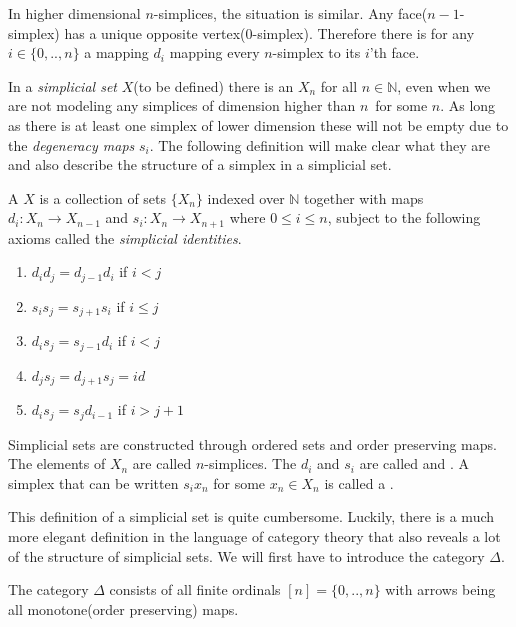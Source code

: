 \documentclass[../../main.tex]{subfiles}
\begin{document}
    In higher dimensional $n$-simplices, the situation is similar. Any face($n-1$-simplex) has a unique opposite vertex($0$-simplex). Therefore there is for any $i \in \{0,..,n\}$ a mapping $d_i$ mapping every $n$-simplex to its $i$'th face.

    In a \emph{simplicial set} $X$(to be defined) there is an $X_n$ for all $n \in \mathbb{N}$, even when we are not modeling any simplices of dimension higher than $n$ for some $n$. As long as there is at least one simplex of lower dimension these will not be empty due to the \emph{degeneracy maps} $s_i$. The following definition will make clear what they are and also describe the structure of a simplex in a simplicial set.

    \begin{definition}\label{simplicial-set}
        A  $X$ is a collection of sets $\{X_n\}$ indexed over $\mathbb{N}$ together with maps $d_i: X_n \to X_{n-1}$ and $s_i: X_n\to X_{n+1}$ where $0 \leq i \leq n$, subject to the following axioms called the \emph{simplicial identities}.
        
        \begin{enumerate}
            \item $d_id_j = d_{j-1}d_i$ if $i < j$
            \item $s_is_j = s_{j+1}s_i$ if $i \leq j$
            \item $d_is_j = s_{j-1}d_i$ if $i < j$
            \item $d_js_j = d_{j+1}s_j = id$
            \item $d_is_j = s_jd_{i-1}$ if $i > j+1$
        \end{enumerate}
    \end{definition}
    Simplicial sets are constructed through ordered sets and order preserving maps. The elements of $X_n$ are called $n$-simplices. The $d_i$ and $s_i$ are called  and . A simplex that can be written $s_ix_n$ for some $x_n \in X_n$ is called a . 
    
    This definition of a simplicial set is quite cumbersome. Luckily, there is a much more elegant definition in the language of category theory that also reveals a lot of the structure of simplicial sets. We will first have to introduce the category $\Delta$.

    \begin{definition}
        The category $\Delta$ consists of all finite ordinals $[n] = \{0, .., n\}$ with arrows being all monotone(order preserving) maps.
    \end{definition}
\end{document}
